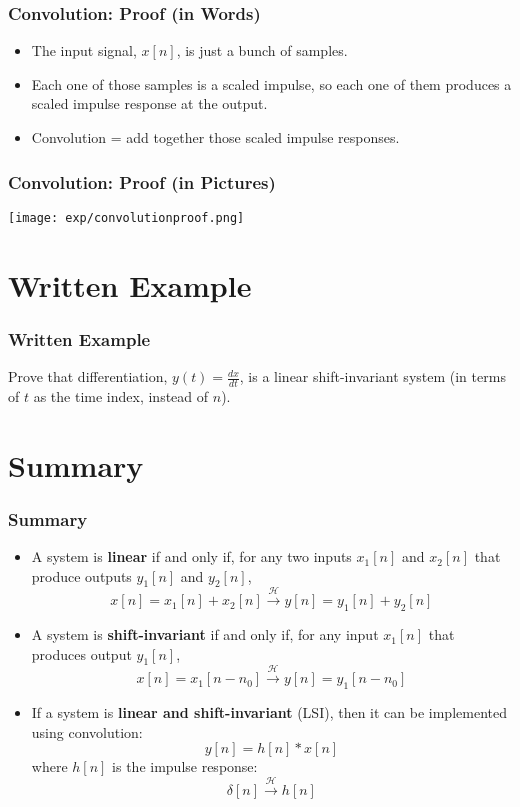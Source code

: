 \documentclass{beamer}
\begin{document}
\begin{frame}
  \frametitle{Convolution: Proof (in Words)}

  \begin{itemize}
  \item The input signal, $x[n]$, is just a bunch of samples.
  \item Each one of those samples is a scaled impulse, so each one of
    them produces a scaled impulse response at the output.
  \item Convolution = add together those scaled impulse responses.
  \end{itemize}
\end{frame}


\begin{frame}
  \frametitle{Convolution: Proof (in Pictures)}

  \centerline{\texttt{[image: exp/convolutionproof.png]}}
\end{frame}

\section[Example]{Written Example}
\setcounter{subsection}{1}

\begin{frame}
  \frametitle{Written Example}

  Prove that differentiation, $y(t)=\frac{dx}{dt}$, is a linear
  shift-invariant system (in terms of $t$ as the time index, instead
  of $n$).
\end{frame}

\section[Summary]{Summary}
\setcounter{subsection}{1}

\begin{frame}
  \frametitle{Summary}
  \begin{itemize}
  \item A system is {\bf linear} if and only if, for any two inputs
    $x_1[n]$ and $x_2[n]$ that produce outputs $y_1[n]$ and $y_2[n]$,
    \[
    x[n]=x_1[n]+x_2[n] \stackrel{\mathcal H}{\longrightarrow}  y[n]=y_1[n]+y_2[n]
    \]
  \item A system is {\bf shift-invariant} if and only if, for any input
    $x_1[n]$ that produces output $y_1[n]$,
    \[
    x[n]=x_1[n-n_0] \stackrel{\mathcal H}{\longrightarrow}  y[n]=y_1[n-n_0]
    \]
  \item If a system is {\bf linear and shift-invariant} (LSI), then it
    can be implemented using convolution:
    \[
    y[n] = h[n]\ast x[n]
    \]
    where $h[n]$ is the impulse response:
    \[
    \delta[n] \stackrel{\mathcal H}{\longrightarrow}  h[n]
    \]
  \end{itemize}
\end{frame}
    
\end{document}
